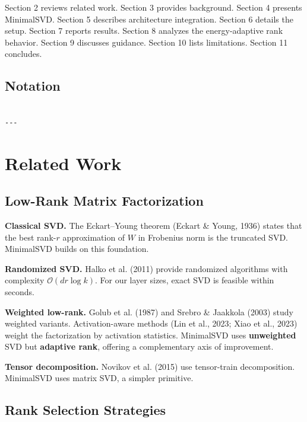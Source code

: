 Section 2 reviews related work. Section 3 provides background. Section 4 
presents MinimalSVD. Section 5 describes architecture integration. Section 
6 details the setup. Section 7 reports results. Section 8 analyzes the 
energy-adaptive rank behavior. Section 9 discusses guidance. Section 10 
lists limitations. Section 11 concludes.



\subsection{Notation}

\begin{lstlisting}

---
\end{lstlisting}


\section{Related Work}

\subsection{Low-Rank Matrix Factorization}

\textbf{Classical SVD.} The Eckart--Young theorem (Eckart \& Young, 1936) states 
that the best rank-$r$ approximation of $W$ in Frobenius norm is the truncated 
SVD. MinimalSVD builds on this foundation.

\textbf{Randomized SVD.} Halko et al. (2011) provide randomized algorithms with 
complexity $\mathcal{O}(dr \log k)$. For our layer sizes, exact SVD is 
feasible within seconds.

\textbf{Weighted low-rank.} Golub et al. (1987) and Srebro \& Jaakkola (2003) study 
weighted variants. Activation-aware methods (Lin et al., 2023; Xiao et al., 
2023) weight the factorization by activation statistics. MinimalSVD uses 
\textbf{unweighted} SVD but \textbf{adaptive rank}, offering a complementary axis of 
improvement.

\textbf{Tensor decomposition.} Novikov et al. (2015) use tensor-train 
decomposition. MinimalSVD uses matrix SVD, a simpler primitive.

\subsection{Rank Selection Strategies}


